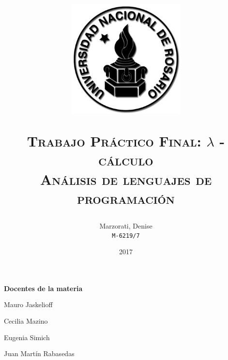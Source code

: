 \documentclass[a4paper,10pt]{article}
\author{
    Marzorati, Denise \\
    \texttt{M-6219/7}
}
\date{
    2017
}
\title{
    \begin{center}
\includegraphics[width=6cm, height=6cm]{logo-unr.png}
\end{center}
\Huge \textsc{{\bfseries T}rabajo {\bfseries P}ráctico {\bfseries F}inal: $\lambda$ - cálculo} \\
    \large \textsc{Análisis de lenguajes de programación} \\
}
\begin{document}
\bigskip
\bigskip
\bigskip

\maketitle

\thispagestyle{empty}

\begin{center}
\large \bf Docentes de la materia
\end{center}

\begin{center}

Mauro Jaskelioff

Cecilia Mazino

Eugenia Simich

Juan Martín Rabasedas

\end{center}

\newpage{}

\normalsize
\end{document}
